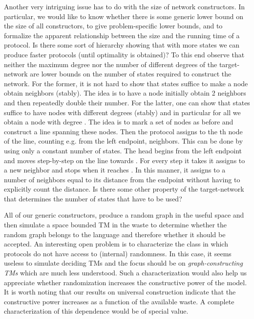 \documentclass[oribibl, 11pt]{llncs}
\begin{document}
Another very intriguing issue has to do with the size of network constructors. In particular, we would like to know whether there is some generic lower bound on the size of all constructors, to give problem-specific lower bounds, and to formalize the apparent relationship between the size and the running time of a protocol. Is there some sort of hierarchy showing that with more states we can produce faster protocols (until optimality is obtained)? To this end observe that neither the maximum degree nor the number of different degrees of the target-network are lower bounds on the number of states required to construct the network. For the former, it is not hard to show that  states suffice to make a node obtain  neighbors (stably). The idea is to have a node initially obtain 2 neighbors and then repeatedly double their number. For the latter, one can show that  states suffice to have  nodes with different degrees (stably) and in particular for all  we obtain a node with degree . The idea is to mark a set of  nodes as before and construct a line spanning these nodes. Then the protocol assigns to the th node of the line, counting e.g. from the left endpoint,  neighbors. This can be done by using only a constant number of states. The head begins from the left endpoint and moves step-by-step on the line towards . For every step it takes it assigns to  a new neighbor and stops when it reaches . In this manner, it assigns to  a number of neighbors equal to its distance from the endpoint without having to explicitly count the distance. Is there some other property of the target-network that determines the number of states that have to be used?

All of our generic constructors, produce a random graph in the useful space and then simulate a space bounded TM in the waste to determine whether the random graph belongs to the language and therefore whether it should be accepted. An interesting open problem is to characterize the class  in which protocols do not have access to (internal) randomness. In this case, it seems useless to simulate deciding TMs and the focus should be on \emph{graph-constructing TMs} which are much less understood. Such a characterization would also help us appreciate whether randomization increases the constructive power of the model. It is worth noting that our results on universal construction indicate that the constructive power increases as a function of the available waste. A complete characterization of this dependence would be of special value. 
\end{document}
